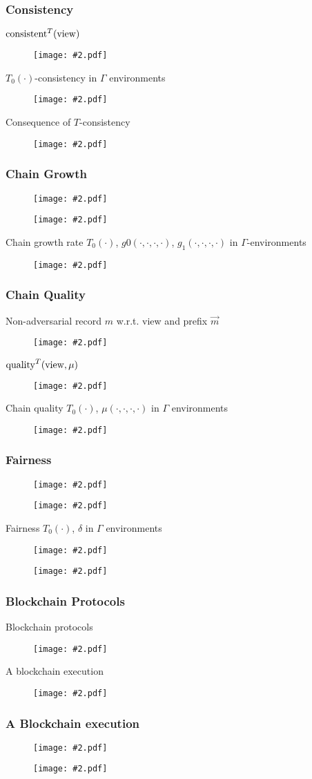 \documentclass{beamer}
\newcommand{\insfig}[2][1]{
	\begin{figure}
		\texttt{[image: \#2.pdf]}
	\end{figure}
}
\newcommand{\insblk}[2]{
	\begin{block}{#1}
		\insfig{#2}
	\end{block}
}
\begin{document}
\begin{spacing}{1.2}
\begin{frame}
	\frametitle{Consistency}
	\insblk{${\rm consistent}^T({\rm view})$}{C1}
	\begin{block}{$T_0(\cdot)$-consistency in $\Gamma$ environments}
		\insfig[0.95]{C2}
	\end{block}
	\insblk{Consequence of $T$-consistency}{c3}
\end{frame}

\begin{frame}
	\frametitle{Chain Growth}
	\vspace{-5pt}
	\insfig[0.7]{CG1}
	\vspace{-10pt}
	\insfig[0.95]{CG2}
	\vspace{-10pt}
	\insblk{Chain growth rate $T_0(\cdot)$, $g0(\cdot, \cdot, \cdot, \cdot)$, $g_1(\cdot, \cdot, \cdot, \cdot)$ in $\Gamma$-environments}{CG3}
\end{frame}

\begin{frame}
	\frametitle{Chain Quality}
	\insblk{Non-adversarial record $m$ w.r.t. view and prefix $\vec{m}$}{CQ1}
	\insblk{${\rm quality}^T({\rm view},\mu)$}{CQ2}
	\insblk{Chain quality $T_0(\cdot)$, $\mu(\cdot, \cdot, \cdot, \cdot)$ in $\Gamma$ environments}{CQ3}
\end{frame}

\begin{frame}
	\frametitle{Fairness}
	\vspace{-3pt}
		\insfig{F1}
		\vspace{-10pt}
		\insfig{F2}
	\vspace{-7pt}
	\insblk{Fairness $T_0(\cdot)$, $\delta$ in $\Gamma$ environments}{F3}
	\vspace{-3pt}
	\insfig{F4}
\end{frame}

\begin{frame}
	\frametitle{Blockchain Protocols}
	\insblk{Blockchain protocols}{BP1}
	\insblk{A blockchain execution}{BP2}
\end{frame}

\begin{frame}
	\frametitle{A Blockchain execution}
	\insfig{BP30}
	\vspace{-20pt}
	\insfig{BP33}
\end{frame}

\end{spacing}
\end{document}
